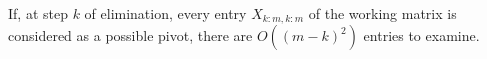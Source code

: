 

If, at step $k$ of elimination, every entry $X_{k:m,k:m}$ of the working matrix is considered as a possible pivot, there are $O((m-k)^2)$ entries to examine.

\blankpage
